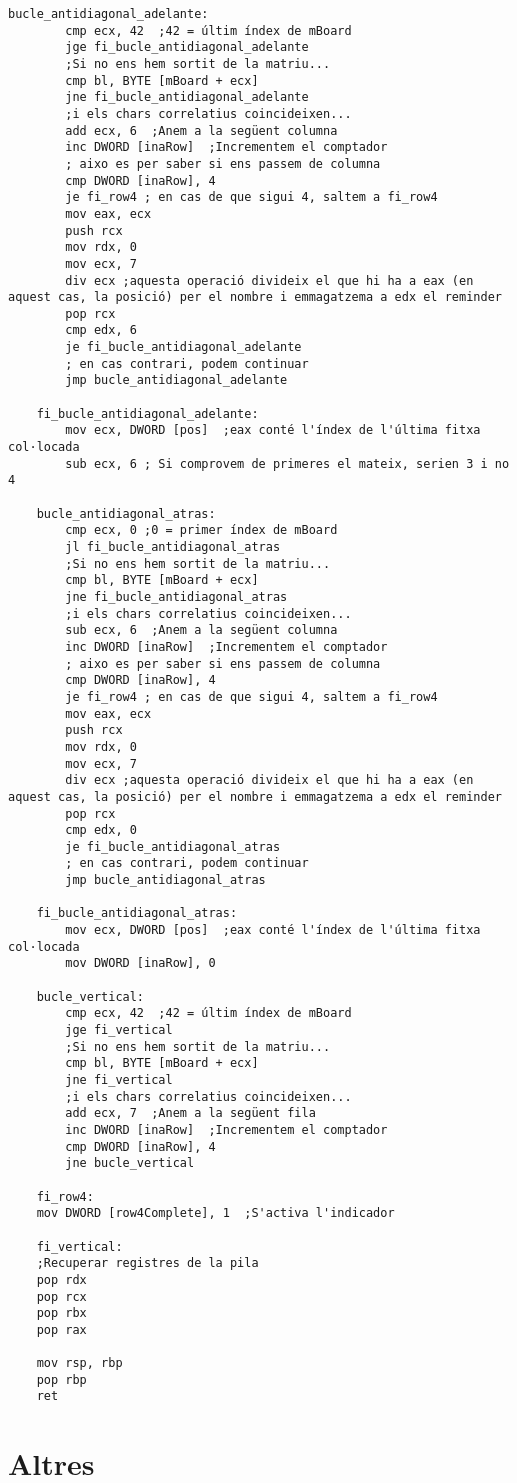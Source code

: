 \documentclass[a4paper,12pt]{article}
\begin{document}
\begin{lstlisting}[firstnumber=524]
    bucle_antidiagonal_adelante:
		cmp ecx, 42  ;42 = últim índex de mBoard
        jge fi_bucle_antidiagonal_adelante
		;Si no ens hem sortit de la matriu...
		cmp bl, BYTE [mBoard + ecx]
        jne fi_bucle_antidiagonal_adelante
        ;i els chars correlatius coincideixen...
        add ecx, 6  ;Anem a la següent columna
        inc DWORD [inaRow]  ;Incrementem el comptador
        ; aixo es per saber si ens passem de columna
        cmp DWORD [inaRow], 4
        je fi_row4 ; en cas de que sigui 4, saltem a fi_row4
        mov eax, ecx
        push rcx
        mov rdx, 0
        mov ecx, 7
        div ecx ;aquesta operació divideix el que hi ha a eax (en aquest cas, la posició) per el nombre i emmagatzema a edx el reminder
        pop rcx
        cmp edx, 6
        je fi_bucle_antidiagonal_adelante
        ; en cas contrari, podem continuar
        jmp bucle_antidiagonal_adelante

    fi_bucle_antidiagonal_adelante:
        mov ecx, DWORD [pos]  ;eax conté l'índex de l'última fitxa col·locada
        sub ecx, 6 ; Si comprovem de primeres el mateix, serien 3 i no 4

    bucle_antidiagonal_atras:
        cmp ecx, 0 ;0 = primer índex de mBoard
        jl fi_bucle_antidiagonal_atras
        ;Si no ens hem sortit de la matriu...
        cmp bl, BYTE [mBoard + ecx]
        jne fi_bucle_antidiagonal_atras
        ;i els chars correlatius coincideixen...
        sub ecx, 6  ;Anem a la següent columna
        inc DWORD [inaRow]  ;Incrementem el comptador
        ; aixo es per saber si ens passem de columna
        cmp DWORD [inaRow], 4
        je fi_row4 ; en cas de que sigui 4, saltem a fi_row4
        mov eax, ecx
        push rcx
        mov rdx, 0
        mov ecx, 7
        div ecx ;aquesta operació divideix el que hi ha a eax (en aquest cas, la posició) per el nombre i emmagatzema a edx el reminder
        pop rcx
        cmp edx, 0
        je fi_bucle_antidiagonal_atras
        ; en cas contrari, podem continuar
        jmp bucle_antidiagonal_atras

    fi_bucle_antidiagonal_atras:
        mov ecx, DWORD [pos]  ;eax conté l'índex de l'última fitxa col·locada
        mov DWORD [inaRow], 0

    bucle_vertical:
        cmp ecx, 42  ;42 = últim índex de mBoard
        jge fi_vertical
        ;Si no ens hem sortit de la matriu...
        cmp bl, BYTE [mBoard + ecx]
        jne fi_vertical
        ;i els chars correlatius coincideixen...
        add ecx, 7  ;Anem a la següent fila
        inc DWORD [inaRow]  ;Incrementem el comptador
        cmp DWORD [inaRow], 4
        jne bucle_vertical

    fi_row4:
    mov DWORD [row4Complete], 1  ;S'activa l'indicador
    
    fi_vertical:
    ;Recuperar registres de la pila
    pop rdx
    pop rcx
    pop rbx
    pop rax

	mov rsp, rbp
	pop rbp
	ret

\end{lstlisting}
\section{Altres}
\end{document}
